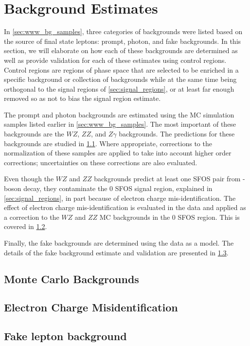 \section{Background Estimates}
\label{sec:bg_estimates}

In \sec\ref{sec:www_bg_samples}, three categories of backgrounds
were listed based on the source
of final state leptons: prompt, photon, and fake
backgrounds. In this section, we will elaborate on how
each of these backgrounds are determined as well
as provide validation for each of these estimates using
control regions. Control regions are regions of phase space
that are selected to be enriched in a specific background
or collection of backgrounds while at the same time being
orthogonal to the signal regions of \sec\ref{sec:signal_regions},
or at least far enough removed so as not to bias the signal region
estimate.

The prompt and photon backgrounds are estimated using 
the MC simulation samples listed earlier in \sec\ref{sec:www_bg_samples}.
The most important of these backgrounds are the $WZ$, $ZZ$, 
and $Z\gamma$ backgrounds. The predictions for these backgrounds
are studied in \sec\ref{sec:mcbg}. Where appropriate, corrections
to the normalization
of these samples are applied to take into account higher order 
corrections; uncertainties on these corrections are also evaluated.

Even though the $WZ$ and $ZZ$ backgrounds predict
at least one SFOS pair from \z-boson decay,
they contaminate the 0 SFOS signal region,
explained in \sec\ref{sec:signal_regions}, in part because
of electron charge mis-identification.  The effect of 
electron charge mis-identification is evaluated in the data
and applied as a correction to the $WZ$ and $ZZ$ MC backgrounds
in the 0 SFOS region. This is covered in \sec\ref{sec:charge_misid}.

Finally, the fake backgrounds are determined 
using the data as a model. The details of the fake background
estimate and validation are presented in \sec\ref{sec:bg_fake}.





\subsection{Monte Carlo Backgrounds}
\label{sec:mcbg}

\subsection{Electron Charge Misidentification}
\label{sec:charge_misid}
  
\subsection{Fake lepton background}
\label{sec:bg_fake}


